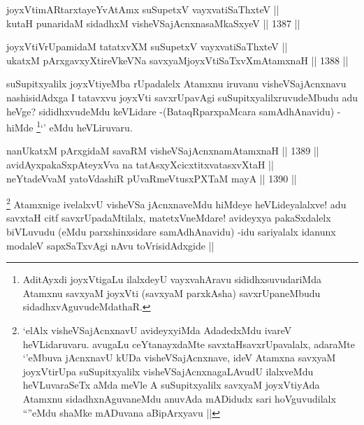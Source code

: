 
\begin{shl}
joyxVtimARtarxtayeYvA\s \s tAmx suSupetxV vayxvatiSaThxteV ||  \\
kutaH punaridaM sidadhxM visheVSajAcnxnasaMkaSxyeV \hfill || 1387 ||  
\end{shl}
				
\begin{shl}
joyxVtiVrUpamidaM tatatxvXM suSupetxV vayxvatiSaThxteV || \\
ukatxM pArxgavxyXtireVkeVNa savxyaMjoyxVtiSaTxvXmAtamxnaH \hfill || 1388 ||  
\end{shl}

\begin{artha}
suSupitxyalilx joyxVtiyeMba rUpadalelx Atamxnu iruvanu visheVSajAcnxnavu nashisidAdxga I tatavxvu joyxVti savxrUpavAgi suSupitxyalilxruvudeMbudu adu heVge? sididhxvudeMdu keVLidare -(BataqRparxpaMcara samAdhAnavidu) - hiMde \footnote{AditAyxdi joyxVtigaLu ilalxdeyU vayxvahAravu sididhxsuvudariMda Atamxnu savxyaM joyxVti (savxyaM parxkAsha) savxrUpaneMbudu sidadhxvAguvudeMdathaR.}`\stext' eMdu heVLiruvaru.
\end{artha}


\begin{shl}
nanUkatxM pArxgidaM savaRM visheVSajAcnxnamAtamxnaH \hfill || 1389 ||  \\
avidAyxpakaSxpAteyxVva na tatAsxyXcicxtitxvatasxvXtaH ||  \\
neYtadeVvaM yatoV\s dashiR pUvaRmeVtusxPXTaM mayA \hfill || 1390 ||  
\end{shl}

\begin{artha}
\footnote{`elAlx visheVSajAcnxnavU avideyxyiMda AdadedxMdu ivareV heVLidaruvaru. avugaLu ceYtanayxdaMte savxtaHsavxrUpavalalx, adaraMte `\stext'eMbuva jAcnxnavU kUDa visheVSajAcnxnave, ideV Atamxna savxyaM joyxVtirUpa suSupitxyalilx visheVSajAcnxnagaLAvudU ilalxveMdu heVLuvaraSeTx aMda meVle A suSupitxyalilx savxyaM joyxVtiyAda Atamxnu sidadhxnAguvaneMdu anuvAda mADidudx sari hoVguvudilalx ``\stext''eMdu shaMke mADuvana aBipArxyavu ||}
Atamxnige ivelalxvU visheVSa jAcnxnaveMdu hiMdeye heVLideyalalxve! adu savxtaH citf savxrUpadaMtilalx, matetxVneMdare! avideyxya pakaSxdalelx biVLuvudu (eMdu parxshinxsidare samAdhAnavidu) -idu sariyalalx idanunx modaleV sapxSaTxvAgi nAvu toVrisidAdxgide ||
\end{artha}

